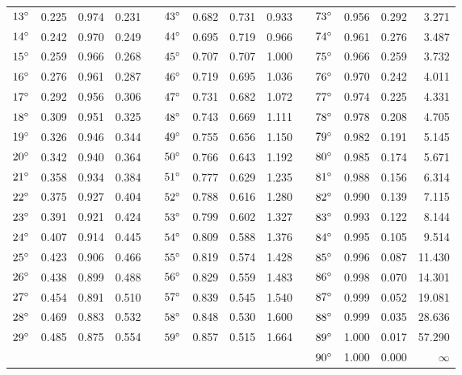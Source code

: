 \begin{tabular}{rrrrrrrrrrrrrr}
$13\mspace{0mu}^\circ$ &  0.225  &  0.974  &  0.231 & & $43\mspace{0mu}^\circ$ &  0.682  &  0.731  &  0.933 & & $73\mspace{0mu}^\circ$ &  0.956  &  0.292  &  3.271\\
$14\mspace{0mu}^\circ$ &  0.242  &  0.970  &  0.249 & & $44\mspace{0mu}^\circ$ &  0.695  &  0.719  &  0.966 & & $74\mspace{0mu}^\circ$ &  0.961  &  0.276  &  3.487\\
$15\mspace{0mu}^\circ$ &  0.259  &  0.966  &  0.268 & & $45\mspace{0mu}^\circ$ &  0.707  &  0.707  &  1.000 & & $75\mspace{0mu}^\circ$ &  0.966  &  0.259  &  3.732\\
$16\mspace{0mu}^\circ$ &  0.276  &  0.961  &  0.287 & & $46\mspace{0mu}^\circ$ &  0.719  &  0.695  &  1.036 & & $76\mspace{0mu}^\circ$ &  0.970  &  0.242  &  4.011\\
$17\mspace{0mu}^\circ$ &  0.292  &  0.956  &  0.306 & & $47\mspace{0mu}^\circ$ &  0.731  &  0.682  &  1.072 & & $77\mspace{0mu}^\circ$ &  0.974  &  0.225  &  4.331\\
$18\mspace{0mu}^\circ$ &  0.309  &  0.951  &  0.325 & & $48\mspace{0mu}^\circ$ &  0.743  &  0.669  &  1.111 & & $78\mspace{0mu}^\circ$ &  0.978  &  0.208  &  4.705\\
$19\mspace{0mu}^\circ$ &  0.326  &  0.946  &  0.344 & & $49\mspace{0mu}^\circ$ &  0.755  &  0.656  &  1.150 & & $79\mspace{0mu}^\circ$ &  0.982  &  0.191  &  5.145\\
$20\mspace{0mu}^\circ$ &  0.342  &  0.940  &  0.364 & & $50\mspace{0mu}^\circ$ &  0.766  &  0.643  &  1.192 & & $80\mspace{0mu}^\circ$ &  0.985  &  0.174  &  5.671\\
$21\mspace{0mu}^\circ$ &  0.358  &  0.934  &  0.384 & & $51\mspace{0mu}^\circ$ &  0.777  &  0.629  &  1.235 & & $81\mspace{0mu}^\circ$ &  0.988  &  0.156  &  6.314\\
$22\mspace{0mu}^\circ$ &  0.375  &  0.927  &  0.404 & & $52\mspace{0mu}^\circ$ &  0.788  &  0.616  &  1.280 & & $82\mspace{0mu}^\circ$ &  0.990  &  0.139  &  7.115\\
$23\mspace{0mu}^\circ$ &  0.391  &  0.921  &  0.424 & & $53\mspace{0mu}^\circ$ &  0.799  &  0.602  &  1.327 & & $83\mspace{0mu}^\circ$ &  0.993  &  0.122  &  8.144\\
$24\mspace{0mu}^\circ$ &  0.407  &  0.914  &  0.445 & & $54\mspace{0mu}^\circ$ &  0.809  &  0.588  &  1.376 & & $84\mspace{0mu}^\circ$ &  0.995  &  0.105  &  9.514\\
$25\mspace{0mu}^\circ$ &  0.423  &  0.906  &  0.466 & & $55\mspace{0mu}^\circ$ &  0.819  &  0.574  &  1.428 & & $85\mspace{0mu}^\circ$ &  0.996  &  0.087  & 11.430\\
$26\mspace{0mu}^\circ$ &  0.438  &  0.899  &  0.488 & & $56\mspace{0mu}^\circ$ &  0.829  &  0.559  &  1.483 & & $86\mspace{0mu}^\circ$ &  0.998  &  0.070  & 14.301\\
$27\mspace{0mu}^\circ$ &  0.454  &  0.891  &  0.510 & & $57\mspace{0mu}^\circ$ &  0.839  &  0.545  &  1.540 & & $87\mspace{0mu}^\circ$ &  0.999  &  0.052  & 19.081\\
$28\mspace{0mu}^\circ$ &  0.469  &  0.883  &  0.532 & & $58\mspace{0mu}^\circ$ &  0.848  &  0.530  &  1.600 & & $88\mspace{0mu}^\circ$ &  0.999  &  0.035  & 28.636\\
$29\mspace{0mu}^\circ$ &  0.485  &  0.875  &  0.554 & & $59\mspace{0mu}^\circ$ &  0.857  &  0.515  &  1.664 & & $89\mspace{0mu}^\circ$ &  1.000  &  0.017  & 57.290\\
&&&&& &&&&& $90\mspace{0mu}^\circ$ &  1.000  &  0.000  & $\infty$\\
\end{tabular}
